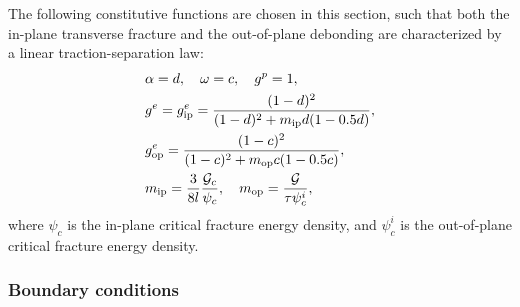 The following constitutive functions are chosen in this section, such that both the in-plane transverse fracture and the out-of-plane debonding are characterized by a linear traction-separation law:
\begin{subequations}
  \begin{align}
     & \alpha = d, \quad \omega = c, \quad g^p = 1,                                                           \\
     & g^e = g^e_\text{ip} = \dfrac{(1-d)^2}{(1-d)^2 + m_\text{ip} d (1 - 0.5 d)},                            \\
     & g^e_\text{op} = \dfrac{(1-c)^2}{(1-c)^2 + m_\text{op} c (1 - 0.5 c)},                                  \\
     & m_\text{ip} = \dfrac{3}{8l}\dfrac{{\mathcal{G}_c}}{\psi_c}, \quad m_\text{op} = \dfrac{\mathcal{G}}{\tau\psi^i_c}, 
  \end{align}
\end{subequations}
where $\psi_c$ is the in-plane critical fracture energy density, and $\psi^i_c$ is the out-of-plane critical fracture energy density.

\subsubsection{Boundary conditions}

